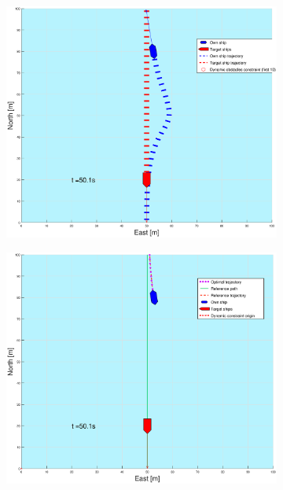 \begin{figure}[ht]\ContinuedFloat
    \begin{subfigure}[b]{0.49\textwidth}
        \centering
        \includegraphics[width=\textwidth]{Images/Figures/enkel_HO/_Simple_0fig1_time=50}
    \end{subfigure}
    \hfill
    \begin{subfigure}[b]{0.499\textwidth}
        \centering
        \includegraphics[width=\textwidth]{Images/Figures/enkel_HO/_Simple_0fig999_time=50}

\end{subfigure}
\end{figure}
